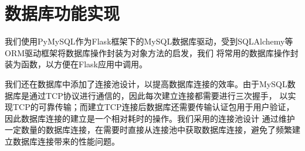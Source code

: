 \section{数据库功能实现}

我们使用PyMySQL作为Flask框架下的MySQL数据库驱动，受到SQLAlchemy等ORM驱动框架将数据库操作封装为对象方法的启发，我们
将常用的数据库操作封装为函数，以方便在Flask应用中调用。

我们还在数据库中添加了连接池设计，以提高数据库连接的效率。由于MySQL数据库是通过TCP协议进行通信的，因此每次建立连接都需要进行三次握手，
以实现TCP的可靠传输；而建立TCP连接后数据库还需要传输认证包用于用户验证，因此数据库连接的建立是一个相对耗时的操作\cite{conn-pool-overhead}。我们采用的连接池设计
通过维护一定数量的数据库连接，在需要时直接从连接池中获取数据库连接，避免了频繁建立数据库连接带来的性能问题。